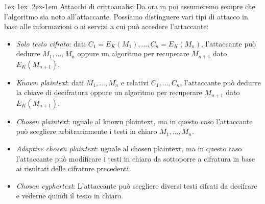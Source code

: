 \documentclass[a4paper, 11pt, notitlepage, fleqn]{report}
\makeatletter
\renewcommand{\paragraph}{%
	\@startsection{paragraph}{4}%
	{\z@}{1ex \@plus 1ex \@minus .2ex}{-1em}%
	{\normalfont\normalsize\bfseries}%
}
\makeatother
\begin{document}
\paragraph{Attacchi di crittoanalisi}
Da ora in poi assumeremo sempre che l'algoritmo sia noto all'attaccante. Possiamo distinguere vari tipi di attacco in base alle informazioni o ai servizi a cui può accedere l'attaccante:
\begin{itemize}
	\item \emph{Solo testo cifrato}: dati $C_1 = E_K(M_1), \dots, C_n = E_K(M_n)$, l'attaccante può dedurre $M_1, \dots, M_n$ oppure un algoritmo per recuperare $M_{n+1}$ dato $E_K(M_{n+1})$.
	\item \emph{Known plaintext}: dati $M_1, \dots, M_n$ e relativi $C_1, \dots, C_n$, l'attaccante può dedurre la chiave di decifratura oppure un algoritmo per recuperare $M_{n+1}$ dato $E_K(M_{n+1})$.
	\item \emph{Chosen plaintext}: uguale al known plaintext, ma in questo caso l'attaccante può scegliere arbitrariamente i testi in chiaro $M_1, \dots, M_n$.
	\item \emph{Adaptive chosen plaintext}: uguale al chosen plaintext, ma in questo caso l'attaccante può modificare i testi in chiaro da sottoporre a cifratura in base ai risultati delle cifrature precedenti.
	\item \emph{Chosen cyphertext}: L'attaccante può scegliere diversi testi cifrati da decifrare e vederne quindi il testo in chiaro.
\end{itemize}

\clearpage
\end{document}
